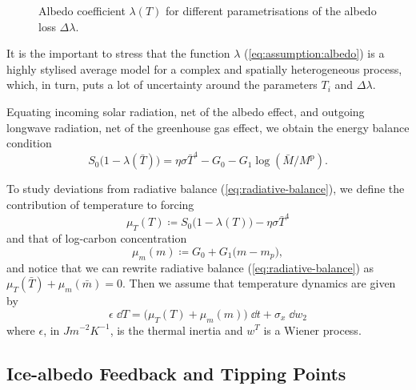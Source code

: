 \documentclass[../../main.tex]{subfiles}
\begin{document}
\begin{figure}[H]
    \centering
    
    \caption{Albedo coefficient $\lambda(T)$ for different parametrisations of the albedo loss $\Delta \lambda$.}
    \label{fig:albedo_coefficient}
\end{figure}

It is the important to stress that the function $\lambda$ (\ref{eq:assumption:albedo}) is a highly stylised average model for a complex and spatially heterogeneous process, which, in turn, puts a lot of uncertainty around the parameters $T_i$ and $\Delta \lambda$. \iffalse In the robustness checks we explore the sensitivity of our results to these parameters. \fi

Equating incoming solar radiation, net of the albedo effect, and outgoing longwave radiation, net of the greenhouse gas effect, we obtain the energy balance condition \begin{equation} \label{eq:radiative-balance}
    S_0 \big(1 - \lambda(\bar{T})\big) = \eta \sigma \bar{T}^4 - G_0 - G_1 \log(\bar{M} / M^{\mathrm{p}}).
\end{equation}

To study deviations from radiative balance (\ref{eq:radiative-balance}), we define the contribution of temperature to forcing \begin{equation} \label{eq:forcing:temperature}
    \mu_T(T) \coloneqq S_0 \big(1 - \lambda(T)\big) - \eta \sigma \bar{T}^4
\end{equation} and that of log-carbon concentration \begin{equation} \label{eq:forcing:concentration}
    \mu_m(m) \coloneqq  G_0 + G_1  \big(m - m_p \big),
\end{equation} and notice that we can rewrite radiative balance (\ref{eq:radiative-balance}) as $\mu_T(\bar{T}) + \mu_m(\bar{m}) = 0$. Then we assume that temperature dynamics are given by \begin{equation} \label{eq:dynamics:x}
    \epsilon \; \dd{T} = \Big(\mu_T(T) + \mu_m(m)\Big) \; \dd{t} + \sigma_x \; \dd{w}_2
\end{equation} where $\epsilon$, in $\unit{J} \unit{m}^{-2} \unit{K}^{-1}$, is the thermal inertia and $w^T$ is a Wiener process.

\subsection{Ice-albedo Feedback and Tipping Points}
\end{document}
